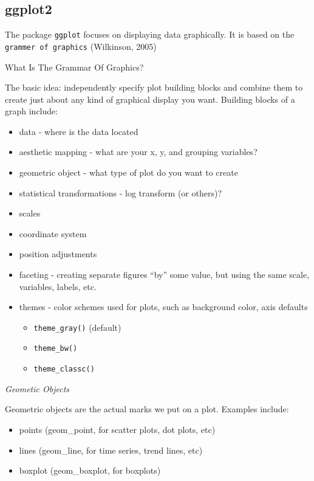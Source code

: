 \documentclass[
]{book}
\providecommand{\tightlist}{%
  \setlength{\itemsep}{0pt}\setlength{\parskip}{0pt}}
\begin{document}
\hypertarget{ggplot2}{%
\subsection{ggplot2}\label{ggplot2}}

The package \texttt{ggplot} focuses on displaying data graphically. It is based on the \texttt{grammer\ of\ graphics} (Wilkinson, 2005)

What Is The Grammar Of Graphics?

The basic idea: independently specify plot building blocks and combine them to create just about any kind of graphical display you want. Building blocks of a graph include:

\begin{itemize}
\tightlist
\item
  data - where is the data located
\item
  aesthetic mapping - what are your x, y, and grouping variables?\\
\item
  geometric object - what type of plot do you want to create
\item
  statistical transformations - log transform (or others)?
\item
  scales
\item
  coordinate system
\item
  position adjustments
\item
  faceting - creating separate figures ``by'' some value, but using the same scale, variables, labels, etc.
\item
  themes - color schemes used for plots, such as background color, axis defaults

  \begin{itemize}
  \tightlist
  \item
    \texttt{theme\_gray()} (default)
  \item
    \texttt{theme\_bw()}
  \item
    \texttt{theme\_classc()}
  \end{itemize}
\end{itemize}

\emph{Geometic Objects}

Geometric objects are the actual marks we put on a plot. Examples include:

\begin{itemize}
\tightlist
\item
  points (geom\_point, for scatter plots, dot plots, etc)
\item
  lines (geom\_line, for time series, trend lines, etc)
\item
  boxplot (geom\_boxplot, for boxplots)
\end{itemize}
\end{document}
